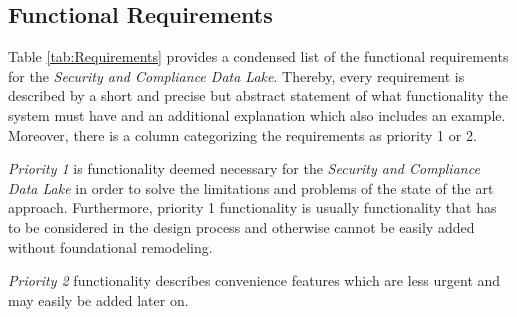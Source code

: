 \subsection{Functional Requirements}
Table \ref{tab:Requirements} provides a condensed list of the functional requirements for the \emph{Security and Compliance Data Lake}. Thereby, every requirement is described by a short and precise but abstract statement of what functionality the system must have and an additional explanation which also includes an example. Moreover, there is a column categorizing the requirements as priority 1 or 2.\par 
\emph{Priority 1} is functionality deemed necessary for the \emph{Security and Compliance Data Lake} in order to solve the limitations and problems of the state of the art approach. Furthermore, priority 1 functionality is usually functionality that has to be considered in the design process and otherwise cannot be easily added without foundational remodeling.\par
\emph{Priority 2} functionality describes convenience features which are less urgent and may easily be added later on.
